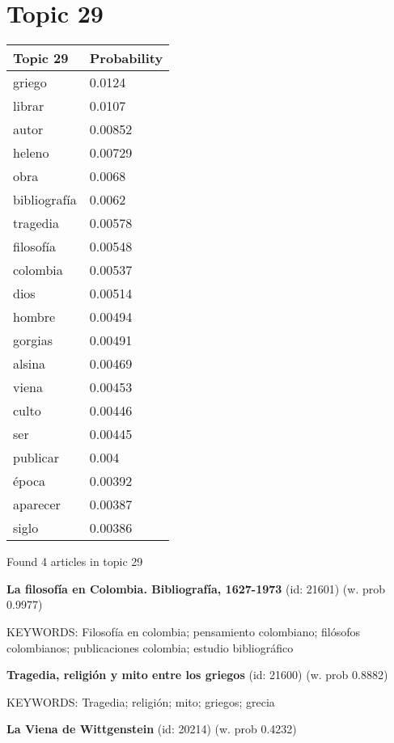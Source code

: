 \documentclass{article}
\begin{document}
\centering
\thispagestyle{empty}
\section*{Topic 29}\vfill
\begin{tabular}{ll}
\toprule
     Topic 29 & Probability \\
\midrule
       griego &      0.0124 \\
       librar &      0.0107 \\
        autor &     0.00852 \\
       heleno &     0.00729 \\
         obra &      0.0068 \\
 bibliografía &      0.0062 \\
     tragedia &     0.00578 \\
    filosofía &     0.00548 \\
     colombia &     0.00537 \\
         dios &     0.00514 \\
       hombre &     0.00494 \\
      gorgias &     0.00491 \\
       alsina &     0.00469 \\
        viena &     0.00453 \\
        culto &     0.00446 \\
          ser &     0.00445 \\
     publicar &       0.004 \\
        época &     0.00392 \\
     aparecer &     0.00387 \\
        siglo &     0.00386 \\
\bottomrule
\end{tabular}

\vfill
Found 4 articles in topic 29
\vfill

\textbf{La filosofía en Colombia. Bibliografía, 1627-1973} (id: 21601)
 (w. prob 0.9977)


KEYWORDS:
Filosofía en colombia; pensamiento colombiano; filósofos colombianos; publicaciones colombia; estudio bibliográfico
\vfill

\textbf{Tragedia, religión y mito entre los griegos} (id: 21600)
 (w. prob 0.8882)


KEYWORDS:
Tragedia; religión; mito; griegos; grecia
\vfill

\textbf{La Viena de Wittgenstein} (id: 20214)
 (w. prob 0.4232)
\end{document}

